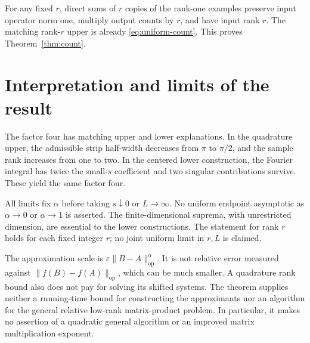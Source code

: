 \documentclass[11pt]{article}
\numberwithin{equation}{section}
\newcommand{\op}{\mathrm{op}}
\begin{document}
For any fixed $r$, direct sums of $r$ copies of the rank-one examples
preserve input operator norm one, multiply output counts by $r$, and
have input rank $r$. The matching rank-$r$ upper is already
\eqref{eq:uniform-count}. This proves Theorem~\ref{thm:count}.

\section{Interpretation and limits of the result}

The factor four has matching upper and lower explanations. In the
quadrature upper, the admissible strip half-width decreases from $\pi$
to $\pi/2$, and the sample rank increases from one to two. In the
centered lower construction, the Fourier integral has twice the
small-$s$ coefficient and two singular contributions survive. These
yield the same factor four.

All limits fix $\alpha$ before taking $s\downarrow0$ or $L\to\infty$.
No uniform endpoint asymptotic as $\alpha\to0$ or $\alpha\to1$ is
asserted. The finite-dimensional suprema, with unrestricted dimension,
are essential to the lower constructions. The statement for rank $r$
holds for each fixed integer $r$; no joint uniform limit in $r,L$ is
claimed.

The approximation scale is $\varepsilon\|B-A\|_\op^\alpha$.
It is not relative error measured against
$\|f(B)-f(A)\|_\op$, which can be much smaller. A quadrature rank bound
also does not pay for solving its shifted systems. The theorem supplies
neither a running-time bound for constructing the approximants nor an
algorithm for the general relative low-rank matrix-product problem.
In particular, it makes no assertion of a quadratic general algorithm
or an improved matrix multiplication exponent.
\end{document}
